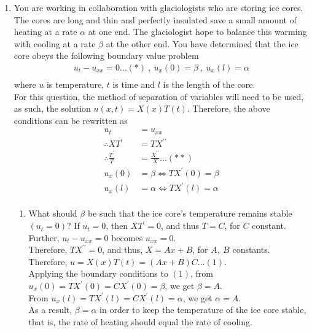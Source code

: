 \documentclass[a4paper]{article}
\newcommand{\ds}{\displaystyle}
\begin{document}
\begin{enumerate}
	\pagebreak
	\item You are working in collaboration with glaciologists who are storing ice cores. The cores are long and thin and perfectly insulated save a small amount of heating at a rate $\ds{\alpha}$ at one end. The glaciologist hope to balance this warming with cooling at a rate $\ds{\beta}$ at the other end. You have determined that the ice core obeys the following boundary value problem
	\begin{align*}
		u_t - u_{xx} = 0\dots(*)\:,\:u_x(0) = \beta\:,\:u_x(l) = \alpha\\
	\end{align*}
	where $\ds{u}$ is temperature, $\ds{t}$ is time and $\ds{l}$ is the length of the core.\\
	\bigbreak
	For this question, the method of separation of variables will need to be used, as such, the solution $\ds{u(x,t) = X(x)T(t)}$. Therefore, the above conditions can be rewritten as 
	\begin{align*}
		u_t & = u_{xx}\\
		\therefore XT^{\prime} & = TX^{\prime\prime}\\
		\therefore \frac{T^{\prime}}{T} & = \frac{X^{\prime\prime}}{X}\dots (**)\\
		u_x(0) & = \beta \iff TX^{\prime}(0) = \beta\\
		u_x(l) & = \alpha \iff TX^{\prime}(l) = \alpha\\
	\end{align*}
	\begin{enumerate}
		\item What should $\ds{\beta}$ be such that the ice core’s temperature remains stable $\ds{(u_t = 0)}$?
		\bigbreak
		If $\ds{u_t = 0}$, then $\ds{XT^{\prime} = 0}$, and thus $\ds{T = C}$, for $\ds{C}$ constant.\\
		Further, $\ds{u_t - u_{xx} = 0}$ becomes $\ds{u_{xx} = 0}$.\\
		Therefore, $\ds{TX^{\prime\prime} = 0}$, and thus, $\ds{X = Ax + B}$, for $\ds{A,\:B}$ constants.\\
		Therefore, $\ds{u = X(x)T(t) = (Ax+B)C \dots(1)}$.\\
		Applying the boundary conditions to $\ds{(1)}$, from $\ds{u_x(0) = TX^{\prime}(0) = CX^{\prime}(0) = \beta}$, we get $\ds{\beta = A}$.\\
		From $\ds{u_x(l) = TX^{\prime}(l) = CX^{\prime}(l) = \alpha}$, we get $\ds{\alpha = A}$.\\ 
		As a result, $\ds{\beta = \alpha}$ in order to keep the temperature of the ice core stable, that is, the rate of heating should equal the rate of cooling.
		\bigbreak


\end{enumerate}
\end{enumerate}
\end{document}
